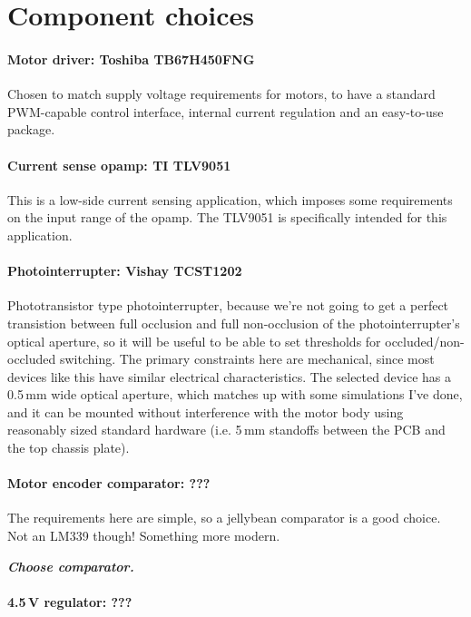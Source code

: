 \documentclass[a4paper,11pt,article]{memoir}
\newcommand{\todo}[1]{{\color{red}\textit{\textbf{#1}}}}
\begin{document}
\section*{Component choices}

\paragraph{Motor driver: Toshiba TB67H450FNG}

Chosen to match supply voltage requirements for motors, to have a
standard PWM-capable control interface, internal current regulation
and an easy-to-use package.

\paragraph{Current sense opamp: TI TLV9051}

This is a low-side current sensing application, which imposes some
requirements on the input range of the opamp. The TLV9051 is
specifically intended for this application.

\paragraph{Photointerrupter: Vishay TCST1202}

Phototransistor type photointerrupter, because we're not going to get
a perfect transistion between full occlusion and full non-occlusion of
the photointerrupter's optical aperture, so it will be useful to be
able to set thresholds for occluded/non-occluded switching. The
primary constraints here are mechanical, since most devices like this
have similar electrical characteristics. The selected device has a
0.5\,mm wide optical aperture, which matches up with some simulations
I've done, and it can be mounted without interference with the motor
body using reasonably sized standard hardware (i.e. 5\,mm standoffs
between the PCB and the top chassis plate).

\paragraph{Motor encoder comparator: ???}

The requirements here are simple, so a jellybean comparator is a good
choice. Not an LM339 though! Something more modern.

\todo{Choose comparator.}

\paragraph{4.5\,V regulator: ???}
\end{document}
